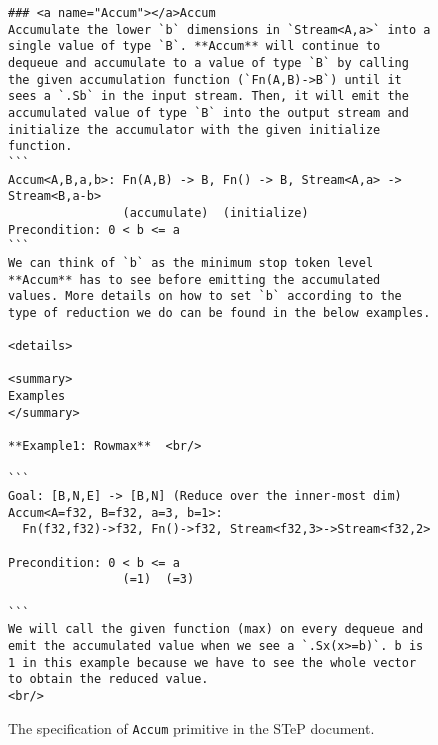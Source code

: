 \begin{figure}[htbp]
\centering
\begin{lstlisting}[language=step, mathescape=true, basicstyle=\scriptsize\ttfamily]
### <a name="Accum"></a>Accum
Accumulate the lower `b` dimensions in `Stream<A,a>` into a single value of type `B`. **Accum** will continue to dequeue and accumulate to a value of type `B` by calling the given accumulation function (`Fn(A,B)->B`) until it sees a `.Sb` in the input stream. Then, it will emit the accumulated value of type `B` into the output stream and initialize the accumulator with the given initialize function.
```
Accum<A,B,a,b>: Fn(A,B) -> B, Fn() -> B, Stream<A,a> -> Stream<B,a-b>
                (accumulate)  (initialize)
Precondition: 0 < b <= a
```
We can think of `b` as the minimum stop token level **Accum** has to see before emitting the accumulated values. More details on how to set `b` according to the type of reduction we do can be found in the below examples.

<details>

<summary>
Examples
</summary>

**Example1: Rowmax**  <br/>

```
Goal: [B,N,E] -> [B,N] (Reduce over the inner-most dim)
Accum<A=f32, B=f32, a=3, b=1>: 
  Fn(f32,f32)->f32, Fn()->f32, Stream<f32,3>->Stream<f32,2>

Precondition: 0 < b <= a
                (=1)  (=3)

```
We will call the given function (max) on every dequeue and emit the accumulated value when we see a `.Sx(x>=b)`. b is 1 in this example because we have to see the whole vector to obtain the reduced value.
<br/>
\end{lstlisting}
\caption{The specification of \texttt{Accum} primitive in the STeP document.}
\label{fig:accum-english}
\end{figure}


